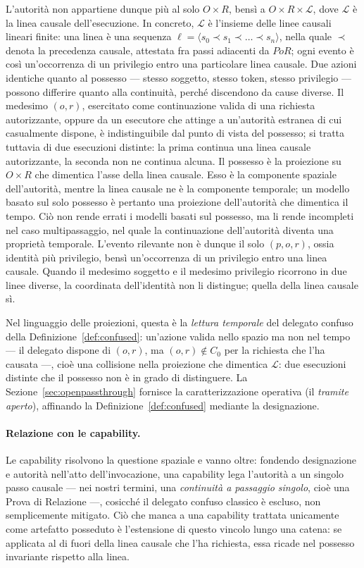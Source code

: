 \documentclass[11pt]{article}
\begin{document}
L'autorità non appartiene dunque più al solo $O \times R$, bensì a
$O \times R \times \mathcal{L}$, dove $\mathcal{L}$ è la linea causale
dell'esecuzione. In concreto, $\mathcal{L}$ è l'insieme delle linee causali
lineari finite: una linea è una sequenza
$\ell = \langle s_0 \prec s_1 \prec \dots \prec s_n \rangle$, nella quale
$\prec$ denota la precedenza causale, attestata fra passi adiacenti da $PoR$;
ogni evento è così un'occorrenza di un privilegio entro una particolare linea
causale. Due azioni identiche quanto al possesso --- stesso soggetto, stesso
token, stesso privilegio --- possono differire quanto alla continuità, perché
discendono da cause diverse. Il medesimo $(o,r)$, esercitato come continuazione
valida di una richiesta autorizzante, oppure da un esecutore che attinge a
un'autorità estranea di cui casualmente dispone, è indistinguibile dal punto di
vista del possesso; si tratta tuttavia di due esecuzioni distinte: la prima
continua una linea causale autorizzante, la seconda non ne continua alcuna.
Il possesso è la proiezione su $O \times R$ che dimentica l'asse della linea
causale. Esso è la componente spaziale dell'autorità, mentre la linea causale ne
è la componente temporale; un modello basato sul solo possesso è pertanto una
proiezione dell'autorità che dimentica il tempo. Ciò non rende errati i modelli
basati sul possesso, ma li rende incompleti nel caso multipassaggio, nel quale la
continuazione dell'autorità diventa una proprietà temporale. L'evento rilevante
non è dunque il solo $(p,o,r)$, ossia identità più privilegio, bensì
un'occorrenza di un privilegio entro una linea causale. Quando il medesimo
soggetto e il medesimo privilegio ricorrono in due linee diverse, la coordinata
dell'identità non li distingue; quella della linea causale sì.

Nel linguaggio delle proiezioni, questa è la \emph{lettura temporale} del
delegato confuso della Definizione~\ref{def:confused}: un'azione valida nello
spazio ma non nel tempo --- il delegato dispone di $(o,r)$, ma
$(o,r) \notin C_0$ per la richiesta che l'ha causata ---, cioè una collisione
nella proiezione che dimentica $\mathcal{L}$: due esecuzioni distinte che il
possesso non è in grado di distinguere. La Sezione~\ref{sec:openpassthrough}
fornisce la caratterizzazione operativa (il \emph{tramite aperto}), affinando la
Definizione~\ref{def:confused} mediante la designazione.

\paragraph{Relazione con le capability.}
Le capability risolvono la questione spaziale e vanno oltre: fondendo
designazione e autorità nell'atto dell'invocazione, una capability lega
l'autorità a un singolo passo causale --- nei nostri termini, una
\emph{continuità a passaggio singolo}, cioè una Prova di Relazione ---, cosicché
il delegato confuso classico è escluso, non semplicemente mitigato. Ciò che manca
a una capability trattata unicamente come artefatto posseduto è l'estensione di
questo vincolo lungo una catena: se applicata al di fuori della linea causale che
l'ha richiesta, essa ricade nel possesso invariante rispetto alla linea.
\end{document}
